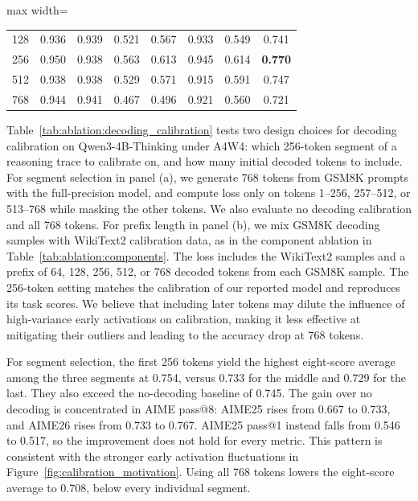 \documentclass{article}
\begin{document}
\begin{table}[!ht]
{\begin{minipage}[t]{0.42\textwidth}
\begin{adjustbox}{max width=\linewidth}
\begin{tabular}{c|ccccccc}
128 & 0.936 & 0.939 & 0.521 & 0.567 & 0.933 & 0.549 & 0.741 \\
\rowcolor{blue!10} 256 & 0.950 & 0.938 & 0.563 & 0.613 & 0.945 & 0.614 & \textbf{0.770} \\
512 & 0.938 & 0.938 & 0.529 & 0.571 & 0.915 & 0.591 & 0.747 \\
768 & 0.944 & 0.941 & 0.467 & 0.496 & 0.921 & 0.560 & 0.721 \\
\bottomrule
\end{tabular}
\end{adjustbox}
\end{minipage}
}
\par\vspace{-5pt}
\end{table}

Table~\ref{tab:ablation:decoding_calibration} tests two design choices for decoding calibration on Qwen3-4B-Thinking under A4W4: which 256-token segment of a reasoning trace to calibrate on, and how many initial decoded tokens to include. For segment selection in panel (a), we generate 768 tokens from GSM8K prompts with the full-precision model, and compute loss only on tokens 1--256, 257--512, or 513--768 while masking the other tokens. We also evaluate no decoding calibration and all 768 tokens. For prefix length in panel (b), we mix GSM8K decoding samples with WikiText2 calibration data, as in the component ablation in Table~\ref{tab:ablation:components}. The loss includes the WikiText2 samples and a prefix of 64, 128, 256, 512, or 768 decoded tokens from each GSM8K sample. The 256-token setting matches the calibration of our reported model and reproduces its task scores. We believe that including later tokens may dilute the influence of high-variance early activations on calibration, making it less effective at mitigating their outliers and leading to the accuracy drop at 768 tokens.

For segment selection, the first 256 tokens yield the highest eight-score average among the three segments at 0.754, versus 0.733 for the middle and 0.729 for the last. They also exceed the no-decoding baseline of 0.745. The gain over no decoding is concentrated in AIME pass@8: AIME25 rises from 0.667 to 0.733, and AIME26 rises from 0.733 to 0.767. AIME25 pass@1 instead falls from 0.546 to 0.517, so the improvement does not hold for every metric. This pattern is consistent with the stronger early activation fluctuations in Figure~\ref{fig:calibration_motivation}. Using all 768 tokens lowers the eight-score average to 0.708, below every individual segment.
\end{document}
